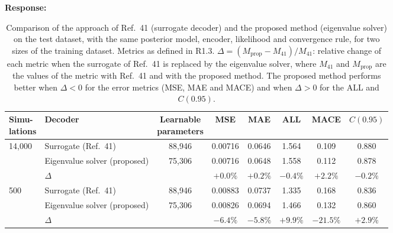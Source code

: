 \documentclass[11pt]{article}
\newenvironment{response}{\par\smallskip\noindent\color{resp}\textbf{Response:}\ }{\par}
\begin{document}
\begin{response}
	\begin{table}[H]
		\centering\small
		\caption{Comparison of the approach of Ref.~41 (surrogate decoder) and the proposed method (eigenvalue solver) on the
			test dataset, with the same posterior model, encoder, likelihood and convergence rule, for two sizes of the
			training dataset. Metrics as defined in R1.3. $\Delta=(M_{\text{prop}}-M_{41})/M_{41}$: relative change of each
			metric when the surrogate of Ref.~41 is replaced by the eigenvalue solver, where $M_{41}$ and $M_{\text{prop}}$
			are the values of the metric with Ref.~41 and with the proposed method. The proposed method performs better when
			$\Delta<0$ for the error metrics (MSE, MAE and MACE) and when $\Delta>0$ for the ALL and $C(0.95)$.}
		\label{tab:surrogate}
		\footnotesize
		\setlength{\tabcolsep}{4pt}
		\begin{tabular}{llcccccc}
			\toprule
			\shortstack{Simu-\\lations} & Decoder & \shortstack{Learnable\\parameters} & MSE & MAE & ALL & MACE & $C(0.95)$ \\
			\midrule
			14,000 & Surrogate (Ref.~41)          & 88,946 & 0.00716 & 0.0646 & 1.564 & 0.109 & 0.880 \\
			       & Eigenvalue solver (proposed) & 75,306 & 0.00716 & 0.0648 & 1.558 & 0.112 & 0.878 \\
			       & $\Delta$                     &        & $+0.0\%$ & $+0.2\%$ & $-0.4\%$ & $+2.2\%$ & $-0.2\%$ \\
			\midrule
			500    & Surrogate (Ref.~41)          & 88,946 & 0.00883 & 0.0737 & 1.335 & 0.168 & 0.836 \\
			       & Eigenvalue solver (proposed) & 75,306 & 0.00826 & 0.0694 & 1.466 & 0.132 & 0.860 \\
			       & $\Delta$                     &        & $\mathbf{-6.4\%}$ & $\mathbf{-5.8\%}$ & $\mathbf{+9.9\%}$ & $\mathbf{-21.5\%}$ & $\mathbf{+2.9\%}$ \\
			\bottomrule
		\end{tabular}
	\end{table}
	

\end{response}
\end{document}
